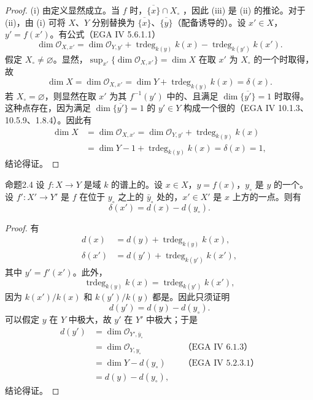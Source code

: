 \begin{proof}
(i) 由定义显然成立。当 $f$ 时，$\overline{\{x\}}\cap X_\circ$ ，因此 (iii) 是 (ii) 的推论。对于 (ii)，由 (i) 可将 $X$、$Y$ 分别替换为 $\overline{\{x\}}$、$\overline{\{y\}}$（配备诱导的）。设 $x'\in X$，$y'=f(x')$。有公式（EGA IV 5.6.1.1）
\[
\dim\mathcal O_{X,x'}=\dim\mathcal O_{Y,y'}+\operatorname{trdeg}_{k(y)}k(x)-\operatorname{trdeg}_{k(y')}k(x').
\]
假定 $X_\circ\ne\varnothing$。显然，$\sup_{x'}\{\dim\mathcal O_{X,x'}\}=\dim X$ 在取 $x'$ 为 $X_\circ$ 的一个时取得，故
\[
\dim X=\dim\mathcal O_{X,x'}=\dim Y+\operatorname{trdeg}_{k(y)}k(x)=\delta(x).
\]
若 $X_\circ=\varnothing$，则显然在取 $x'$ 为其 $f^{-1}(y')$ 中的、且满足 $\dim\overline{\{y'\}}=1$ 时取得。这种点存在，因为满足 $\dim\overline{\{y'\}}=1$ 的 $y'\in Y$ 构成一个很的（EGA IV 10.1.3、10.5.9、1.8.4）。因此有
\[
\begin{aligned}
\dim X&=\dim\mathcal O_{X,x'}=\dim\mathcal O_{Y,y'}+\operatorname{trdeg}_{k(y)}k(x)\\
&=\dim Y-1+\operatorname{trdeg}_{k(y)}k(x)=\delta(x)=1,
\end{aligned}
\]
结论得证。
\end{proof}
\begin{SGAresult}{命题}{2.4}
设 $f:X\to Y$ 是域 $k$ 的谱上的。设 $x\in X$，$y=f(x)$，$y_\circ$ 是 $y$ 的一个。设 $f':X'\to Y'$ 是 $f$ 在位于 $y_\circ$ 之上的 $\bar y_\circ$ 处的，$x'\in X'$ 是 $x$ 上方的一点。则有
\[
\delta(x')=d(x)-d(y_\circ).
\]
\end{SGAresult}
\begin{proof}
有
\[
\begin{aligned}
d(x)&=d(y)+\operatorname{trdeg}_{k(y)}k(x),\\
\delta(x')&=d(y')+\operatorname{trdeg}_{k(y')}k(x'),
\end{aligned}
\]
其中 $y'=f'(x')$。此外，
\[
\operatorname{trdeg}_{k(y)}k(x)=\operatorname{trdeg}_{k(y')}k(x'),
\]
因为 $k(x')/k(x)$ 和 $k(y')/k(y)$ 都是。因此只须证明
\[
d(y')=d(y)-d(y_\circ).
\]
可以假定 $y$ 在 $Y$ 中极大，故 $y'$ 在 $Y'$ 中极大；于是
\[
\begin{aligned}
d(y')&=\dim\mathcal O_{Y',\bar y_\circ}\\
&=\dim\mathcal O_{Y,y_\circ}&&\text{（EGA IV 6.1.3）}\\
&=\dim Y-d(y_\circ)&&\text{（EGA IV 5.2.3.1）}\\
&=d(y)-d(y_\circ),
\end{aligned}
\]
结论得证。
\end{proof}
